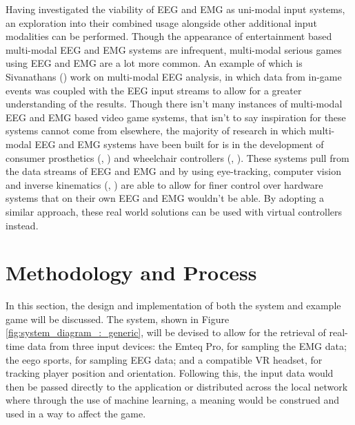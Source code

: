 \documentclass[11pt, a4paper]{article}
\newcommand{\ccite}[1]{(\citeauthor{#1}, \citeyear{#1})}
\newcommand{\cciteyear}[1]{(\citeyear{#1})}
\newcommand{\reffigure}[1]{Figure \ref{#1}}
\begin{document}
\hfill
  
Having investigated the viability of EEG and EMG as uni-modal input systems, an exploration into their combined usage alongside other additional input modalities can be performed. Though the appearance of entertainment based multi-modal EEG and EMG systems are infrequent, multi-modal serious games using EEG and EMG are a lot more common. An example of which is Sivanathans \cciteyear{sivanathan2014temporal} work on multi-modal EEG analysis, in which data from in-game events was coupled with the EEG input streams to allow for a greater understanding of the results. Though there isn't many instances of multi-modal EEG and EMG based video game systems, that isn't to say inspiration for these systems cannot come from elsewhere, the majority of research in which multi-modal EEG and EMG systems have been built for is in the development of consumer prosthetics \ccite{shi2019novel} and wheelchair controllers \ccite{carlson2013brain}. These systems pull from the data streams of EEG and EMG and by using eye-tracking, computer vision and inverse kinematics \ccite{mcmullen2013demonstration} are able to allow for finer control over hardware systems that on their own EEG and EMG wouldn't be able. By adopting a similar approach, these real world solutions can be used with virtual controllers instead. 







\pagebreak
\section{Methodology and Process}			%

In this section, the design and implementation of both the system and example game will be discussed. The system, shown in \reffigure{fig:system_diagram_:_generic}, will be devised to allow for the retrieval of real-time data from three input devices: the Emteq Pro, for sampling the EMG data; the eego sports, for sampling EEG data; and a compatible VR headset, for tracking player position and orientation. Following this, the input data would then be passed directly to the application or distributed across the local network where through the use of machine learning, a meaning would be construed and used in a way to affect the game.
\end{document}

